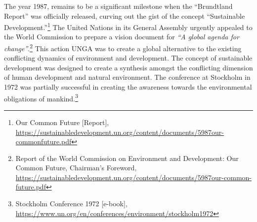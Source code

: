 \setcounter{figure}{0}
\setcounter{table}{0}
\setcounter{footnote}{0}

\label{2021-art5}

\vspace{-.3cm}




\begin{multicols}{2}


\vspace{-.15cm}

\noi
The year 1987, remains to be a significant milestone when the “Brundtland Report” was
officially released, curving out the gist of the concept “Sustainable Development.”\footnote{Our Common Future [Report], \url{https://sustainabledevelopment.un.org/content/documents/5987our-commonfuture.pdf}}
 The
United Nations in its General Assembly urgently appealed to the World Commission to
prepare a vision document for \textit{“A global agenda for change”}.\footnote{Report of the World Commission on Environment and Development: Our Common Future, Chairman’s Foreword, \url{https://sustainabledevelopment.un.org/content/documents/5987our-common-future.pdf}}
 This action UNGA was to
create a global alternative to the existing conflicting dynamics of environment and
development. The concept of sustainable development was designed to create a synthesis
amongst the conflicting dimension of human development and natural environment. The
conference at Stockholm in 1972 was partially successful in creating the awareness towards
the environmental obligations of mankind.\footnote{Stockholm Conference 1972 [e-book], \url{https://www.un.org/en/conferences/environment/stockholm1972}}

\vspace{-.15cm}


\end{multicols}
